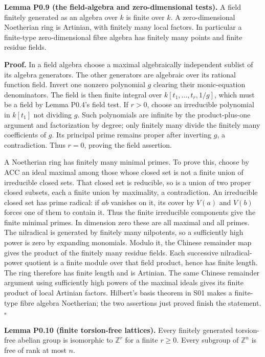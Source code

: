 \documentclass[11pt,a4paper,openany]{report}
\begin{document}
\textbf{Lemma P0.9 (the field-algebra and zero-dimensional tests).} A field finitely generated as an algebra over \(k\) is finite over \(k\). A zero-dimensional Noetherian ring is Artinian, with finitely many local factors. In particular a finite-type zero-dimensional fibre algebra has finitely many points and finite residue fields.

\textbf{Proof.} In a field algebra choose a maximal algebraically independent sublist of its algebra generators. The other generators are algebraic over its rational function field. Invert one nonzero polynomial \(g\) clearing their monic-equation denominators. The field is then finite integral over \(k[t_1,\ldots,t_r,1/g]\), which must be a field by Lemma P0.4's field test. If \(r>0\), choose an irreducible polynomial in \(k[t_1]\) not dividing \(g\). Such polynomials are infinite by the product-plus-one argument and factorization by degree; only finitely many divide the finitely many coefficients of \(g\). Its principal prime remains proper after inverting \(g\), a contradiction. Thus \(r=0\), proving the field assertion.

A Noetherian ring has finitely many minimal primes. To prove this, choose by ACC an ideal maximal among those whose closed set is not a finite union of irreducible closed sets. That closed set is reducible, so is a union of two proper closed subsets, each a finite union by maximality, a contradiction. An irreducible closed set has prime radical: if \(ab\) vanishes on it, its cover by \(V(a)\) and \(V(b)\) forces one of them to contain it. Thus the finite irreducible components give the finite minimal primes. In dimension zero these are all maximal and all primes. The nilradical is generated by finitely many nilpotents, so a sufficiently high power is zero by expanding monomials. Modulo it, the Chinese remainder map gives the product of the finitely many residue fields. Each successive nilradical-power quotient is a finite module over that field product, hence has finite length. The ring therefore has finite length and is Artinian. The same Chinese remainder argument using sufficiently high powers of the maximal ideals gives its finite product of local Artinian factors. Hilbert's basis theorem in S01 makes a finite-type fibre algebra Noetherian; the two assertions just proved finish the statement. \(\square\)

\label{AG-RG-S04-finite-torsion-free-lattices}

\textbf{Lemma P0.10 (finite torsion-free lattices).} Every finitely generated torsion-free abelian group is isomorphic to \(\mathbb Z^r\) for a finite \(r\geq0\). Every subgroup of \(\mathbb Z^n\) is free of rank at most \(n\).
\end{document}

